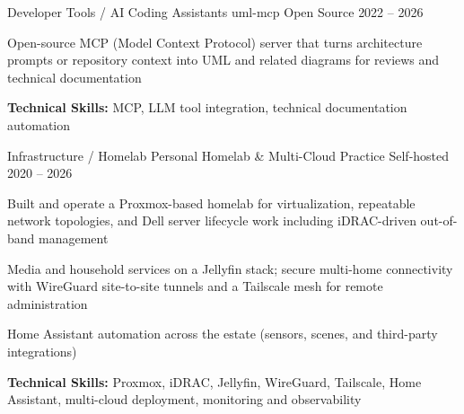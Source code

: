 

\begin{cventries}

\cventry
    {Developer Tools / AI Coding Assistants} %
    {uml-mcp} %
    {Open Source} %
    {2022 -- 2026} %
    {
    \begin{cvitems} %
    \item {Open-source MCP (Model Context Protocol) server that turns architecture prompts or repository context into UML and related diagrams for reviews and technical documentation}
    \item {\textbf{Technical Skills:} MCP, LLM tool integration, technical documentation automation}
    \end{cvitems}
    }

\cventry
    {Infrastructure / Homelab} %
    {Personal Homelab \& Multi-Cloud Practice} %
    {Self-hosted} %
    {2020 -- 2026} %
    {
    \begin{cvitems} %
    \item {Built and operate a Proxmox-based homelab for virtualization, repeatable network topologies, and Dell server lifecycle work including iDRAC-driven out-of-band management}
    \item {Media and household services on a Jellyfin stack; secure multi-home connectivity with WireGuard site-to-site tunnels and a Tailscale mesh for remote administration}
    \item {Home Assistant automation across the estate (sensors, scenes, and third-party integrations)}
    \item {\textbf{Technical Skills:} Proxmox, iDRAC, Jellyfin, WireGuard, Tailscale, Home Assistant, multi-cloud deployment, monitoring and observability}
    \end{cvitems}
    }


\end{cventries}
